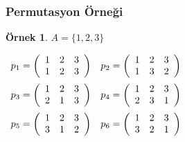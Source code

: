 \documentclass[dvipsnames]{beamer}
\theoremstyle{definition}
\theoremstyle{example}
\newtheorem{ornek}[theorem]{Örnek}
\theoremstyle{plain}
\begin{document}
\begin{frame}
  \frametitle{Permutasyon Örneği}

  \begin{ornek}
    $A = \{1,2,3\}$

    \medskip
    $\begin{array}{cc}
      p_1 = \left(
        \begin{array}{ccc}
          1 & 2 & 3\\
          1 & 2 & 3
        \end{array}
      \right) &
      p_2 = \left(
        \begin{array}{ccc}
          1 & 2 & 3\\
          1 & 3 & 2
        \end{array}
      \right)\medskip\\
      p_3 = \left(
        \begin{array}{ccc}
          1 & 2 & 3\\
          2 & 1 & 3
        \end{array}
      \right) &
      p_4 = \left(
        \begin{array}{ccc}
          1 & 2 & 3\\
          2 & 3 & 1
        \end{array}
      \right)\medskip\\
      p_5 = \left(
        \begin{array}{ccc}
          1 & 2 & 3\\
          3 & 1 & 2
        \end{array}
      \right) &
      p_6 = \left(
        \begin{array}{ccc}
          1 & 2 & 3\\
          3 & 2 & 1
        \end{array}
      \right)
    \end{array}$
  \end{ornek}
\end{frame}
\end{document}
